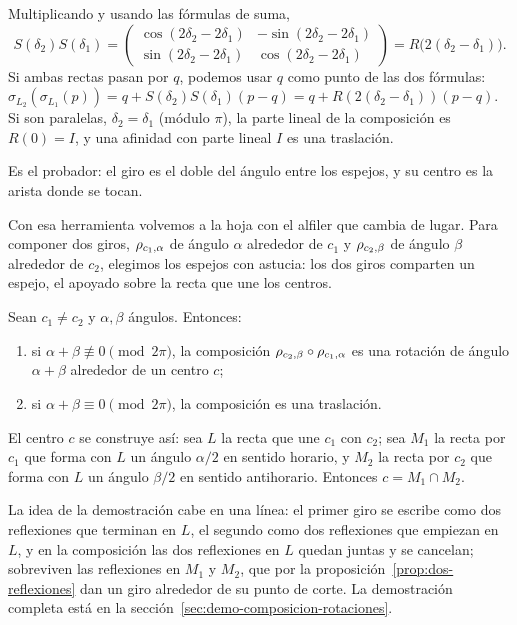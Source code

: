 \begin{demostracion}
Multiplicando y usando las fórmulas de suma,
\[
S(\delta_2)S(\delta_1)=
\begin{pmatrix}
\cos(2\delta_2-2\delta_1)&-\sin(2\delta_2-2\delta_1)\\
\sin(2\delta_2-2\delta_1)&\cos(2\delta_2-2\delta_1)
\end{pmatrix}
=R\bigl(2(\delta_2-\delta_1)\bigr).
\]
Si ambas rectas pasan por \(q\), podemos usar \(q\) como punto de las dos fórmulas:
\(\sigma_{L_2}(\sigma_{L_1}(p))=q+S(\delta_2)S(\delta_1)(p-q)=q+R(2(\delta_2-\delta_1))(p-q)\).
Si son paralelas, \(\delta_2=\delta_1\) (módulo \(\pi\)), la parte lineal de la composición es
\(R(0)=I\), y una afinidad con parte lineal \(I\) es una traslación.
\end{demostracion}

Es el probador: el giro es el doble del ángulo entre los espejos, y su centro es la arista
donde se tocan.

Con esa herramienta volvemos a la hoja con el alfiler que cambia de lugar. Para componer dos
giros, \(\rho_{c_1,\alpha}\) de ángulo \(\alpha\) alrededor de \(c_1\) y \(\rho_{c_2,\beta}\)
de ángulo \(\beta\) alrededor de \(c_2\), elegimos los espejos con astucia: los dos giros
comparten un espejo, el apoyado sobre la recta que une los centros.

\begin{proposicion}\label{prop:composicion-rotaciones}
Sean \(c_1\neq c_2\) y \(\alpha,\beta\) ángulos. Entonces:
\begin{enumerate}
  \item si \(\alpha+\beta\not\equiv0\pmod{2\pi}\), la composición
  \(\rho_{c_2,\beta}\circ\rho_{c_1,\alpha}\) es una rotación de ángulo \(\alpha+\beta\)
  alrededor de un centro \(c\);
  \item si \(\alpha+\beta\equiv0\pmod{2\pi}\), la composición es una traslación.
\end{enumerate}
El centro \(c\) se construye así: sea \(L\) la recta que une \(c_1\) con \(c_2\); sea \(M_1\)
la recta por \(c_1\) que forma con \(L\) un ángulo \(\alpha/2\) en sentido horario, y \(M_2\)
la recta por \(c_2\) que forma con \(L\) un ángulo \(\beta/2\) en sentido antihorario.
Entonces \(c=M_1\cap M_2\).
\end{proposicion}

La idea de la demostración cabe en una línea: el primer giro se escribe como dos reflexiones
que terminan en \(L\), el segundo como dos reflexiones que empiezan en \(L\), y en la
composición las dos reflexiones en \(L\) quedan juntas y se cancelan; sobreviven las
reflexiones en \(M_1\) y \(M_2\), que por la proposición~\ref{prop:dos-reflexiones} dan un
giro alrededor de su punto de corte. La demostración completa está en la
sección~\ref{sec:demo-composicion-rotaciones}.

